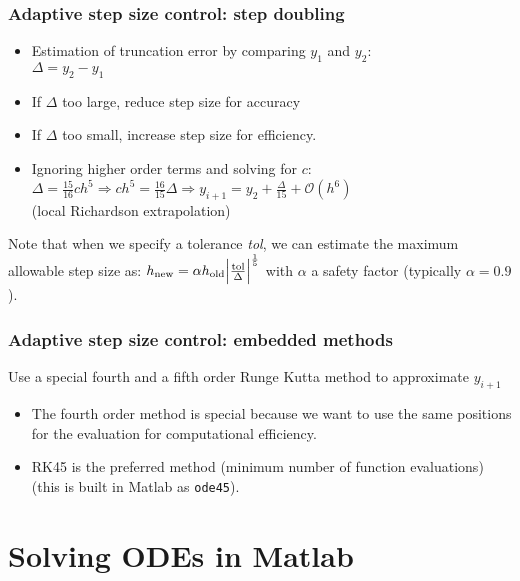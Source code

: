 \begin{frame}
  \frametitle{Adaptive step size control: step doubling}
\begin{itemize}
  \item Estimation of truncation error by comparing $y_1$ and $y_2$:\\
  $\Delta = y_2 - y_1$
  \item If $\Delta$ too large, reduce step size for accuracy
  \item If $\Delta$ too small, increase step size for efficiency.
  \item Ignoring higher order terms and solving for $c$:
  $ \Delta = \frac{15}{16}ch^5 \Rightarrow ch^5 = \frac{16}{15} \Delta \Rightarrow y_{i+1} = y_2 + \frac{\Delta}{15} + \mathcal{O}{(h^6)}$ \\ (local Richardson extrapolation)
\end{itemize}
  Note that when we specify a tolerance \emph{tol}, we can estimate the maximum allowable step size as:
  $ h_\text{new} = \alpha h_\text{old} \abs{\frac{\text{tol}}{\Delta}}^{\frac{1}{5}}$ with $\alpha$ a safety factor (typically $\alpha = 0.9$).
\end{frame}

\begin{frame}
  \frametitle{Adaptive step size control: embedded methods}
  Use a special fourth and a fifth order Runge Kutta method to approximate $y_{i+1}$
  \begin{itemize}
    \item The fourth order method is special because we want to use the same positions for the evaluation for computational efficiency.
    \item RK45 is the preferred method (minimum number of function evaluations) (this is built in Matlab as \lstinline$ode45$).
  \end{itemize}
\end{frame}

\section{Solving ODEs in Matlab}
